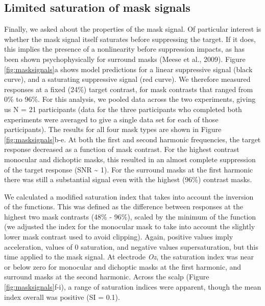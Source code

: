 \documentclass[]{article}
\begin{document}
\hypertarget{limited-saturation-of-mask-signals}{%
\subsection{Limited saturation of mask signals}\label{limited-saturation-of-mask-signals}}

Finally, we asked about the properties of the mask signal. Of particular interest is whether the mask signal itself saturates before suppressing the target. If it does, this implies the presence of a nonlinearity before suppression impacts, as has been shown psychophysically for surround masks (Meese et al., 2009). Figure \ref{fig:masksignals}a shows model predictions for a linear suppressive signal (black curve), and a saturating suppressive signal (red curve). We therefore measured responses at a fixed (24\%) target contrast, for mask contrasts that ranged from 0\% to 96\%. For this analysis, we pooled data across the two experiments, giving us N = 21 participants (data for the three participants who completed both experiments were averaged to give a single data set for each of those participants). The results for all four mask types are shown in Figure \ref{fig:masksignals}b-e. At both the first and second harmonic frequencies, the target response decreased as a function of mask contrast. For the highest contrast monocular and dichoptic masks, this resulted in an almost complete suppression of the target response (SNR \textasciitilde{} 1). For the surround masks at the first harmonic there was still a substantial signal even with the highest (96\%) contrast masks.

We calculated a modified saturation index that takes into account the inversion of the functions. This was defined as the difference between responses at the highest two mask contrasts (48\% - 96\%), scaled by the minimum of the function (we adjusted the index for the monocular mask to take into account the slightly lower mask contrast used to avoid clipping). Again, positive values imply acceleration, values of 0 saturation, and negative values supersaturation, but this time applied to the mask signal. At electrode \emph{Oz}, the saturation index was near or below zero for monocular and dichoptic masks at the first harmonic, and surround masks at the second harmonic. Across the scalp (Figure \ref{fig:masksignals}f-i), a range of saturation indices were apparent, though the mean index overall was positive (SI = 0.1).
\end{document}
